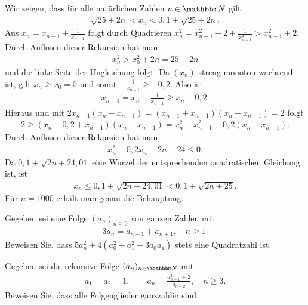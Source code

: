\documentclass[11pt,a4paper]{article}
\begin{document}
\begin{beweis} Wir zeigen, dass für alle natürlichen Zahlen $n\in \N $ gilt
\begin{align}\label{in-1}
\sqrt{25 +2n} < x_n < 0{,}1 +\sqrt{25 +2n}.
\end{align}
Aus $ x_n=x_{n-1} + \frac{1}{x_{n-1}}$ folgt durch Quadrieren $x_n^ 2=x_{n-1}^
2 +2 +\frac{1}{x_{n-1}^2}> x_{n-1}^ 2 +2$.  Durch Auflösen dieser Rekursion hat
man
\begin{gather*}
x_n^2 > x_0^2 +2n = 25 +2n
\end{gather*}
und die linke Seite der Ungleichung folgt.  Da $(x_n)$ streng monoton wachsend
ist, gilt ${x_n\ge x_0=5}$ und somit $-\frac{1}{x_{n-1}}\ge -0,2$. Also ist
\begin{gather*}
x_{n-1}=x_n -\frac{1}{x_{n-1}} \ge x_n -0,2.
\end{gather*} 
Hieraus und mit $2x_{n-1}(x_n -x_{n-1})=(x_{n-1} +x_{n-1})(x_n -x_{n-1})=2 $
folgt
\begin{gather*}
2\ge (x_n -0,2 +x_{n-1})(x_n- x_{n-1})=x_n^ 2 -x_{n-1}^2 -0,2 (x_n -x_{n-1}).
\end{gather*}
Durch Auflösen dieser Rekursion hat man
\begin{gather*}
x_n^2 -0,2 x_n -2n -24 \le 0.
\end{gather*} 
Da $0,1 +\sqrt{2n +24,01} $ eine Wurzel der entsprechenden quadratischen
Gleichung ist, ist
\begin{gather*}
x_n\le 0,1 +\sqrt{2n +24,01} < 0,1 +\sqrt{2n +25}.
\end{gather*} 
Für $n=1000$ erhält man genau die Behauptung.
\end{beweis}

\begin{aufgabe}
Gegeben sei eine Folge $(a_n)_{n\ge 0}$ von ganzen Zahlen mit
\begin{gather*}
3 a_{n}= a_{n-1}  +a_{n+1}, \quad n\ge 1.
\end{gather*}
Beweisen Sie, dass $5a_n^2 +4( a_0^2 +a_1^2 -3a_0a_1) $ stets eine Quadratzahl
ist.
\end{aufgabe}

\begin{aufgabe} Gegeben sei die rekursive Folge $(a_n)_{n\in\N } $ mit
\begin{gather*}
a_1=a_2=1,\quad \quad a_{n}=\frac{a_{n-1}^2 +2}{a_{n-2}}, \quad n\ge 3.
\end{gather*}
Beweisen Sie, dass alle Folgenglieder ganzzahlig sind.
\end{aufgabe}
\end{document}
